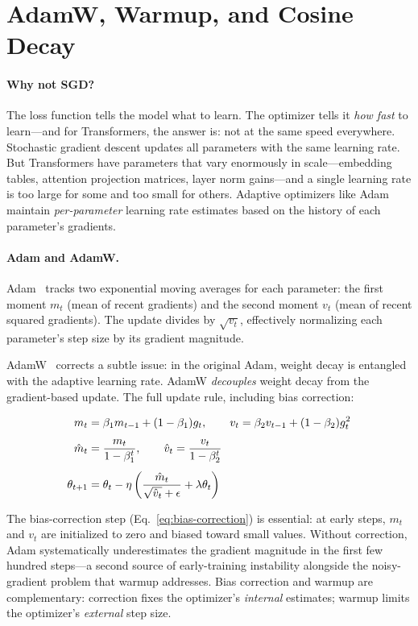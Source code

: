 \section{AdamW, Warmup, and Cosine Decay}

\paragraph{Why not SGD?} The loss function tells the model what to learn. The optimizer tells it \emph{how fast} to learn---and for Transformers, the answer is: not at the same speed everywhere. Stochastic gradient descent updates all parameters with the same learning rate. But Transformers have parameters that vary enormously in scale---embedding tables, attention projection matrices, layer norm gains---and a single learning rate is too large for some and too small for others. Adaptive optimizers like Adam maintain \emph{per-parameter} learning rate estimates based on the history of each parameter's gradients.

\paragraph{Adam and AdamW.} Adam~\cite{kingma2015adam} tracks two exponential moving averages for each parameter: the first moment $m_t$ (mean of recent gradients) and the second moment $v_t$ (mean of recent squared gradients). The update divides by $\sqrt{v_t}$, effectively normalizing each parameter's step size by its gradient magnitude.

AdamW~\cite{loshchilov2019adamw} corrects a subtle issue: in the original Adam, weight decay is entangled with the adaptive learning rate. AdamW \emph{decouples} weight decay from the gradient-based update. The full update rule, including bias correction:

\begin{align}
  m_t &= \beta_1 m_{t-1} + (1 - \beta_1) g_t, \qquad
  v_t = \beta_2 v_{t-1} + (1 - \beta_2) g_t^2 \notag \\[4pt]
  \hat{m}_t &= \frac{m_t}{1 - \beta_1^t}, \qquad
  \hat{v}_t = \frac{v_t}{1 - \beta_2^t} \label{eq:bias-correction} \\[4pt]
  \theta_{t+1} &= \theta_t - \eta \left( \frac{\hat{m}_t}{\sqrt{\hat{v}_t} + \epsilon} + \lambda \theta_t \right) \notag
\end{align}

\noindent The bias-correction step (Eq.~\ref{eq:bias-correction}) is essential: at early steps, $m_t$ and $v_t$ are initialized to zero and biased toward small values. Without correction, Adam systematically underestimates the gradient magnitude in the first few hundred steps---a second source of early-training instability alongside the noisy-gradient problem that warmup addresses. Bias correction and warmup are complementary: correction fixes the optimizer's \emph{internal} estimates; warmup limits the optimizer's \emph{external} step size.

